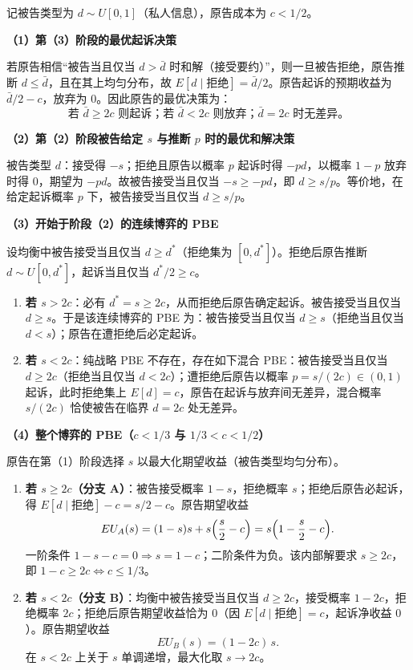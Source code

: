 \sol 记被告类型为 $d\sim U[0,1]$（私人信息），原告成本为 $c<1/2$。

\noindent\textbf{（1）第（3）阶段的最优起诉决策}

若原告相信“被告当且仅当 $d>\bar d$ 时和解（接受要约）”，则一旦被告拒绝，原告推断 $d\le \bar d$，且在其上均匀分布，故 $E[d\mid\text{拒绝}]=\bar d/2$。原告起诉的预期收益为 $\bar d/2-c$，放弃为 $0$。因此原告的最优决策为：
\[
  \text{若 }\bar d\ge 2c\text{ 则起诉；若 }\bar d<2c\text{ 则放弃；}\bar d=2c\text{ 时无差异。}
\]

\noindent\textbf{（2）第（2）阶段被告给定 $s$ 与推断 $p$ 时的最优和解决策}

被告类型 $d$：接受得 $-s$；拒绝且原告以概率 $p$ 起诉时得 $-pd$，以概率 $1-p$ 放弃时得 $0$，期望为 $-pd$。故被告接受当且仅当 $-s\ge -pd$，即 $d\ge s/p$。等价地，在给定起诉概率 $p$ 下，被告接受当且仅当 $d\ge s/p$。

\noindent\textbf{（3）开始于阶段（2）的连续博弈的 PBE}

设均衡中被告接受当且仅当 $d\ge d^*$（拒绝集为 $[0,d^*]$）。拒绝后原告推断 $d\sim U[0,d^*]$，起诉当且仅当 $d^*/2\ge c$。

\begin{enumerate}[leftmargin=1.6em]
  \item \textbf{若 $s>2c$}：必有 $d^*=s\ge 2c$，从而拒绝后原告确定起诉。被告接受当且仅当 $d\ge s$。于是该连续博弈的 PBE 为：被告接受当且仅当 $d\ge s$（拒绝当且仅当 $d<s$）；原告在遭拒绝后必定起诉。
  \item \textbf{若 $s<2c$}：纯战略 PBE 不存在，存在如下混合 PBE：被告接受当且仅当 $d\ge 2c$（拒绝当且仅当 $d<2c$）；遭拒绝后原告以概率 $p=s/(2c)\in(0,1)$ 起诉，此时拒绝集上 $E[d]=c$，原告在起诉与放弃间无差异，混合概率 $s/(2c)$ 恰使被告在临界 $d=2c$ 处无差异。
\end{enumerate}

\noindent\textbf{（4）整个博弈的 PBE（$c<1/3$ 与 $1/3<c<1/2$）}

原告在第（1）阶段选择 $s$ 以最大化期望收益（被告类型均匀分布）。

\begin{enumerate}[leftmargin=1.6em]
  \item \textbf{若 $s\ge 2c$（分支 A）}：被告接受概率 $1-s$，拒绝概率 $s$；拒绝后原告必起诉，得 $E[d\mid\text{拒绝}]-c=s/2-c$。原告期望收益
  \[
    EU_A(s)=(1-s)s+s\Bigl(\frac{s}{2}-c\Bigr)=s\Bigl(1-\frac{s}{2}-c\Bigr).
  \]\indent
  一阶条件 $1-s-c=0\Rightarrow s=1-c$；二阶条件为负。该内部解要求 $s\ge 2c$，即 $1-c\ge 2c\iff c\le 1/3$。
  \item \textbf{若 $s<2c$（分支 B）}：均衡中被告接受当且仅当 $d\ge 2c$，接受概率 $1-2c$，拒绝概率 $2c$；拒绝后原告期望收益恰为 $0$（因 $E[d\mid\text{拒绝}]=c$，起诉净收益 $0$）。原告期望收益
  \[
    EU_B(s)=(1-2c)\,s.
  \]\indent
  在 $s<2c$ 上关于 $s$ 单调递增，最大化取 $s\to 2c$。
\end{enumerate}

